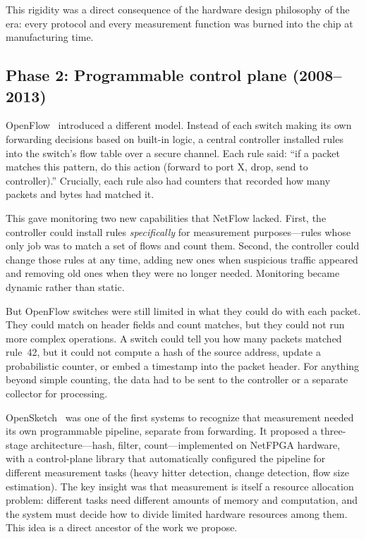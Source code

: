 \documentclass[letterpaper,twocolumn,10pt]{article}
\begin{document}
This rigidity was a direct consequence of the hardware design
philosophy of the era: every protocol and every measurement
function was burned into the chip at manufacturing time.

\subsection{Phase 2: Programmable control plane (2008--2013)}

OpenFlow~\cite{mckeown2008openflow} introduced a different model.
Instead of each switch making its own forwarding decisions based
on built-in logic, a central controller installed rules into the
switch's flow table over a secure channel. Each rule said: ``if a
packet matches this pattern, do this action (forward to port X,
drop, send to controller).'' Crucially, each rule also had
counters that recorded how many packets and bytes had matched it.

This gave monitoring two new capabilities that NetFlow lacked.
First, the controller could install rules \emph{specifically}
for measurement purposes---rules whose only job was to match a
set of flows and count them. Second, the controller could change
those rules at any time, adding new ones when suspicious traffic
appeared and removing old ones when they were no longer needed.
Monitoring became dynamic rather than static.

But OpenFlow switches were still limited in what they could do
with each packet. They could match on header fields and count
matches, but they could not run more complex operations. A switch
could tell you how many packets matched rule~42, but it could not
compute a hash of the source address, update a probabilistic
counter, or embed a timestamp into the packet header. For
anything beyond simple counting, the data had to be sent to the
controller or a separate collector for processing.

OpenSketch~\cite{yu2013opensketch} was one of the first systems
to recognize that measurement needed its own programmable
pipeline, separate from forwarding. It proposed a three-stage
architecture---hash, filter, count---implemented on NetFPGA
hardware, with a control-plane library that automatically
configured the pipeline for different measurement tasks (heavy
hitter detection, change detection, flow size estimation). The
key insight was that measurement is itself a resource allocation
problem: different tasks need different amounts of memory and
computation, and the system must decide how to divide limited
hardware resources among them. This idea is a direct ancestor
of the work we propose.
\end{document}
